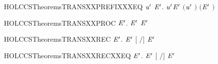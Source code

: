 \newcommand{\HOLCCSTheoremsTRANSXXPREFIX}{\UseVerbatim{HOLCCSTheoremsTRANSXXPREFIX}}
\begin{SaveVerbatim}{HOLCCSTheoremsTRANSXXPREFIXXXEQ}
\HOLTokenTurnstile{} \HOLSymConst{\HOLTokenForall{}}  \ensuremath{\HOLBoundVar{u}\sp{\prime}} \ensuremath{\HOLBoundVar{E}\sp{\prime}}. \HOLSymConst{\ensuremath{\ldotp}} \HOLTokenTransBegin\ensuremath{\HOLBoundVar{u}\sp{\prime}}\HOLTokenTransEnd \ensuremath{\HOLBoundVar{E}\sp{\prime}} \HOLSymConst{\HOLTokenEquiv{}} \ensuremath{(}\ensuremath{\HOLBoundVar{u}\sp{\prime}} \HOLSymConst{\ensuremath{=}} \ensuremath{)} \HOLSymConst{\HOLTokenConj{}} \ensuremath{(}\ensuremath{\HOLBoundVar{E}\sp{\prime}} \HOLSymConst{\ensuremath{=}} \ensuremath{)}
\end{SaveVerbatim}
\newcommand{\HOLCCSTheoremsTRANSXXPREFIXXXEQ}{\UseVerbatim{HOLCCSTheoremsTRANSXXPREFIXXXEQ}}
\begin{SaveVerbatim}{HOLCCSTheoremsTRANSXXPROC}
\HOLTokenTurnstile{} \HOLSymConst{\HOLTokenForall{}}  \ensuremath{\HOLBoundVar{E}\sp{\prime}}.  \HOLTokenTransBegin{}\HOLTokenTransEnd \ensuremath{\HOLBoundVar{E}\sp{\prime}} \HOLSymConst{\HOLTokenConj{}}   \HOLSymConst{\HOLTokenImp{}}  \ensuremath{\HOLBoundVar{E}\sp{\prime}}
\end{SaveVerbatim}
\newcommand{\HOLCCSTheoremsTRANSXXPROC}{\UseVerbatim{HOLCCSTheoremsTRANSXXPROC}}
\begin{SaveVerbatim}{HOLCCSTheoremsTRANSXXREC}
\HOLTokenTurnstile{} \HOLSymConst{\HOLTokenForall{}}   \ensuremath{\HOLBoundVar{E}\sp{\prime}}.    \HOLTokenTransBegin{}\HOLTokenTransEnd \ensuremath{\HOLBoundVar{E}\sp{\prime}} \HOLSymConst{\HOLTokenImp{}} \ensuremath{[}  \ensuremath{/}\ensuremath{]}  \HOLTokenTransBegin{}\HOLTokenTransEnd \ensuremath{\HOLBoundVar{E}\sp{\prime}}
\end{SaveVerbatim}
\newcommand{\HOLCCSTheoremsTRANSXXREC}{\UseVerbatim{HOLCCSTheoremsTRANSXXREC}}
\begin{SaveVerbatim}{HOLCCSTheoremsTRANSXXRECXXEQ}
\HOLTokenTurnstile{} \HOLSymConst{\HOLTokenForall{}}   \ensuremath{\HOLBoundVar{E}\sp{\prime}}.    \HOLTokenTransBegin{}\HOLTokenTransEnd \ensuremath{\HOLBoundVar{E}\sp{\prime}} \HOLSymConst{\HOLTokenEquiv{}} \ensuremath{[}  \ensuremath{/}\ensuremath{]}  \HOLTokenTransBegin{}\HOLTokenTransEnd \ensuremath{\HOLBoundVar{E}\sp{\prime}}
\end{SaveVerbatim}
